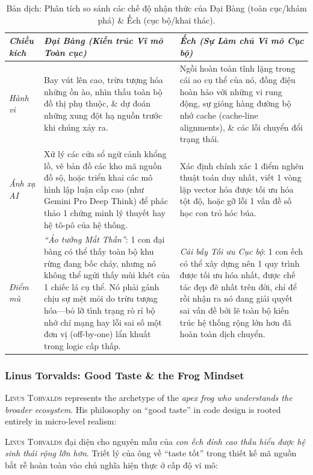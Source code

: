 \documentclass{article}
\begin{document}
\begin{table}[H]
	\centering
	\small
	\begin{tabularx}{\textwidth}{|p{2.5cm}|X|X|}
		\hline
		\emph{Chiều kích} & \emph{Đại Bàng (Kiến trúc Vĩ mô Toàn cục)} & \emph{Ếch (Sự Làm chủ Vi mô Cục bộ)} \\ \hline
		\emph{Hành vi} & Bay vút lên cao, trừu tượng hóa những ồn ào, nhìn thấu toàn bộ đồ thị phụ thuộc, \& dự đoán những xung đột hạ nguồn trước khi chúng xảy ra. & Ngồi hoàn toàn tĩnh lặng trong cái ao cụ thể của nó, đồng điệu hoàn hảo với những vi rung động, sự gióng hàng đường bộ nhớ cache (cache-line alignments), \& các lỗi chuyển đổi trạng thái. \\ \hline
		\emph{Ánh xạ AI} & Xử lý các cửa sổ ngữ cảnh khổng lồ, vẽ bản đồ các kho mã nguồn đồ sộ, hoặc triển khai các mô hình lập luận cấp cao (như Gemini Pro Deep Think) để phác thảo 1 chứng minh lý thuyết hay hệ tô-pô của hệ thống. & Xác định chính xác 1 điểm nghẽn thuật toán duy nhất, viết 1 vòng lặp vector hóa được tối ưu hóa tột độ, hoặc gỡ lỗi 1 vấn đề số học con trỏ hóc búa. \\ \hline
		\emph{Điểm mù} & \textit{``Ảo tưởng Mắt Thần''}: 1 con đại bàng có thể thấy toàn bộ khu rừng đang bốc cháy, nhưng nó không thể ngửi thấy mùi khét của 1 chiếc lá cụ thể. Nó phải gánh chịu sự mệt mỏi do trừu tượng hóa---bỏ lỡ tình trạng rò rỉ bộ nhớ chí mạng hay lỗi sai số một đơn vị (off-by-one) lẩn khuất trong logic cấp thấp. & \textit{Cái bẫy Tối ưu Cục bộ}: 1 con ếch có thể xây dựng nên 1 quy trình được tối ưu hóa nhất, được chế tác đẹp đẽ nhất trên đời, chỉ để rồi nhận ra nó đang giải quyết sai vấn đề bởi lẽ toàn bộ kiến trúc hệ thống rộng lớn hơn đã hoàn toàn dịch chuyển. \\ \hline
	\end{tabularx}
	\caption{Bản dịch: Phân tích so sánh các chế độ nhận thức của Đại Bàng (toàn cục/khám phá) \& Ếch (cục bộ/khai thác).}
\end{table}

\subsubsection{Linus Torvalds: Good Taste \& the Frog Mindset}

\textsc{Linus Torvalds} represents the archetype of the \textit{apex frog who understands the broader ecosystem}. His philosophy on ``good taste'' in code design is rooted entirely in micro-level realism:

\textsc{Linus Torvalds} đại diện cho nguyên mẫu của \textit{con ếch đỉnh cao thấu hiểu được hệ sinh thái rộng lớn hơn}. Triết lý của ông về ``taste tốt'' trong thiết kế mã nguồn bắt rễ hoàn toàn vào chủ nghĩa hiện thực ở cấp độ vi mô:
\end{document}
